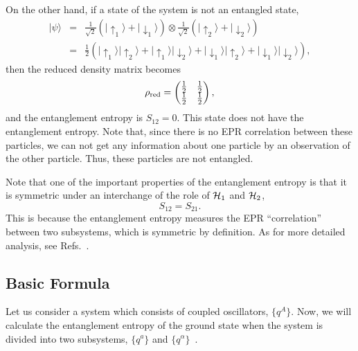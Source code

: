 \documentclass[12pt,epsf]{article}
\begin{document}
On the other hand,
if a state of the system is not an entangled state,
\begin{eqnarray}
  |\psi\rangle &=&\frac{1}{\sqrt{2}}\left(|\uparrow_1\rangle
   +|\downarrow_1\rangle\right)
  \otimes\frac{1}{\sqrt{2}}\left(|\uparrow_2\rangle
   +|\downarrow_2\rangle\right) \nonumber \\
    &=& \frac{1}{2} 
    \left(|\uparrow_1\rangle|\uparrow_2\rangle
         +|\uparrow_1\rangle|\downarrow_2\rangle
         +|\downarrow_1\rangle|\uparrow_2\rangle
         +|\downarrow_1\rangle|\downarrow_2\rangle \right),
\end{eqnarray}
then the reduced density matrix becomes
\begin{equation}
\rho_{{\rm red}}=\begin{pmatrix} \frac{1}{2} & \frac{1}{2} \cr
                 \frac{1}{2} & \frac{1}{2} \cr \end{pmatrix},
\end{equation}
and the entanglement entropy is $S_{12}=0$.
This state does not have the entanglement entropy.
Note that, since there is no EPR correlation
between these particles,
we can not get any information about one particle by 
an observation of the other particle.
Thus, these particles are not entangled.

Note that one of the important properties
of the entanglement entropy is that it is symmetric
under an interchange of the role of
${\cal H}_1$ and ${\cal H}_2$, 
\begin{equation}
S_{12}=S_{21}.
\label{symm}
\end{equation}
This is because the entanglement entropy measures
the EPR ``correlation'' between two subsystems,
which is symmetric by definition.
As for more detailed analysis,
see Refs.~\cite{Sredni93,MuSeKo97}.

\subsection{Basic Formula}
Let us consider a system
which consists of coupled oscillators, $\{q^A\}$.
Now, we will calculate the entanglement entropy
of the ground state when the system is divided
into two subsystems, $\{q^a\}$ and $\{q^\alpha\}$~\cite{BKLS86}.
\end{document}

